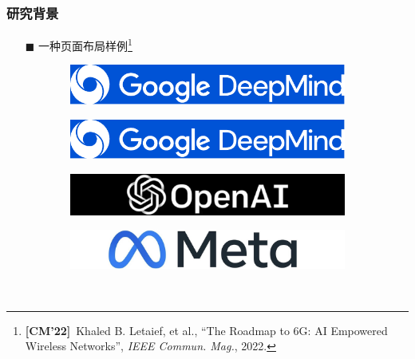 \documentclass[9pt,fontset=windows]{ctexbeamer}
\begin{document}
	\begin{frame}[t]
		\frametitle{研究背景}
		\vspace{-3mm}
		\begin{itemize}
			\LARGE\heiti
			\item[$\blacksquare$] 一种页面布局样例\footnote{{\color{bitlightgreen}\bf[CM'22]}\ Khaled B. Letaief, et al., ``The Roadmap to 6G: AI Empowered Wireless Networks'', {\em IEEE Commun. Mag.}, 2022.}
		\end{itemize}
		\vspace{2mm}
		\begin{figure}
			\begin{subfigure}{0.23\textwidth}
				\centering
				\includegraphics[width=\textwidth, height=0.13\textwidth]{assets/deepmindlogo.pdf}
			\end{subfigure}\hfill
			\begin{subfigure}{0.23\textwidth}
				\centering
				\includegraphics[width=\textwidth, height=0.13\textwidth]{assets/deepmindlogo.pdf}
			\end{subfigure}\hfill
			\begin{subfigure}{0.23\textwidth}
				\centering
				\includegraphics[width=\textwidth, height=0.13\textwidth]{assets/openai.png}
			\end{subfigure}\hfill
			\begin{subfigure}{0.23\textwidth}
				\centering
				\includegraphics[width=\textwidth, height=0.13\textwidth]{assets/metaai.png}
			\end{subfigure}
			\\\vspace{2mm}

\end{figure}
\end{frame}
\end{document}
